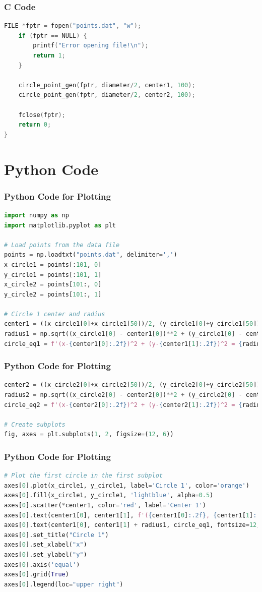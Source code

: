 \documentclass{beamer}
\begin{document}
\begin{frame}[fragile]
\frametitle{C Code}
\begin{lstlisting}[language=C]
 FILE *fptr = fopen("points.dat", "w");
    if (fptr == NULL) {
        printf("Error opening file!\n");
        return 1;
    }
    
    circle_point_gen(fptr, diameter/2, center1, 100);
    circle_point_gen(fptr, diameter/2, center2, 100);

    fclose(fptr);
    return 0;
}
\end{lstlisting}
\end{frame}
\section{Python Code}
\begin{frame}[fragile]
\frametitle{Python Code for Plotting}
\begin{lstlisting}[language=Python]
import numpy as np
import matplotlib.pyplot as plt

# Load points from the data file
points = np.loadtxt("points.dat", delimiter=',')
x_circle1 = points[:101, 0]
y_circle1 = points[:101, 1]
x_circle2 = points[101:, 0]
y_circle2 = points[101:, 1]

# Circle 1 center and radius
center1 = ((x_circle1[0]+x_circle1[50])/2, (y_circle1[0]+y_circle1[50])/2)
radius1 = np.sqrt((x_circle1[0] - center1[0])**2 + (y_circle1[0] - center1[1])**2)
circle_eq1 = f'(x-{center1[0]:.2f})^2 + (y-{center1[1]:.2f})^2 = {radius1**2:.2f}'

\end{lstlisting}
\end{frame}
\begin{frame}[fragile]
\frametitle{Python Code for Plotting}
\begin{lstlisting}[language=Python]
center2 = ((x_circle2[0]+x_circle2[50])/2, (y_circle2[0]+y_circle2[50])/2)
radius2 = np.sqrt((x_circle2[0] - center2[0])**2 + (y_circle2[0] - center2[1])**2)
circle_eq2 = f'(x-{center2[0]:.2f})^2 + (y-{center2[1]:.2f})^2 = {radius2**2:.2f}'

# Create subplots
fig, axes = plt.subplots(1, 2, figsize=(12, 6))

\end{lstlisting}
\end{frame}
\begin{frame}[fragile]
\frametitle{Python Code for Plotting}
\begin{lstlisting}[language=Python]
# Plot the first circle in the first subplot
axes[0].plot(x_circle1, y_circle1, label='Circle 1', color='orange')
axes[0].fill(x_circle1, y_circle1, 'lightblue', alpha=0.5)
axes[0].scatter(*center1, color='red', label='Center 1')
axes[0].text(center1[0], center1[1], f'({center1[0]:.2f}, {center1[1]:.2f})', fontsize=10, ha='right')
axes[0].text(center1[0], center1[1] + radius1, circle_eq1, fontsize=12, ha='center', color='black')
axes[0].set_title("Circle 1")
axes[0].set_xlabel("x")
axes[0].set_ylabel("y")
axes[0].axis('equal')
axes[0].grid(True)
axes[0].legend(loc="upper right")
\end{lstlisting}
\end{frame}
\end{document}
